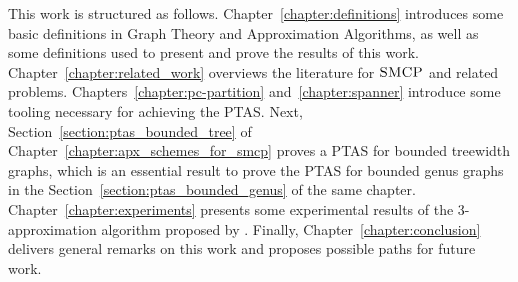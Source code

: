 This work is structured as follows. Chapter~\ref{chapter:definitions} introduces some basic definitions in Graph Theory and Approximation Algorithms, as well as some definitions used to present and prove the results of this work. Chapter~\ref{chapter:related_work} overviews the literature for \(\textsc{SMCP}\) and related problems. Chapters~\ref{chapter:pc-partition} and~\ref{chapter:spanner} introduce some tooling necessary for achieving the PTAS. Next, Section~\ref{section:ptas_bounded_tree} of Chapter~\ref{chapter:apx_schemes_for_smcp} proves a PTAS for bounded treewidth graphs, which is an essential result to prove the PTAS for bounded genus graphs in the Section~\ref{section:ptas_bounded_genus} of the same chapter. Chapter~\ref{chapter:experiments} presents some experimental results of the 3-approximation algorithm proposed by \cite{smcp_3apx}. Finally, Chapter~\ref{chapter:conclusion} delivers general remarks on this work and proposes possible paths for future work.
